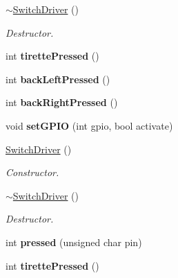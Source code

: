 \begin{DoxyCompactItemize}
\hyperlink{classSwitchDriver_a8a8cb8dff5ed4c61b9da36389c21dcf8}{$\sim$\+Switch\+Driver} ()
\begin{DoxyCompactList}\small\item\em Destructor. \end{DoxyCompactList}\item 
\mbox{\label{classSwitchDriver_a1b2f0e72af9da5be2432978f13bf52ca}} 
int {\bfseries tirette\+Pressed} ()
\item 
\mbox{\label{classSwitchDriver_a97cf6ca8501fbd0ca937c366b32ee191}} 
int {\bfseries back\+Left\+Pressed} ()
\item 
\mbox{\label{classSwitchDriver_af20343abbad7e959ce0fadb3c8bdb145}} 
int {\bfseries back\+Right\+Pressed} ()
\item 
\mbox{\label{classSwitchDriver_a1523b4e4d6f833ac1fbcb6204104d287}} 
void {\bfseries set\+G\+P\+IO} (int gpio, bool activate)
\item 
\mbox{\label{classSwitchDriver_a318f2cc1988d9ddfae71131fcf39d929}} 
\hyperlink{classSwitchDriver_a318f2cc1988d9ddfae71131fcf39d929}{Switch\+Driver} ()
\begin{DoxyCompactList}\small\item\em Constructor. \end{DoxyCompactList}\item 
\mbox{\label{classSwitchDriver_a8a8cb8dff5ed4c61b9da36389c21dcf8}} 
\hyperlink{classSwitchDriver_a8a8cb8dff5ed4c61b9da36389c21dcf8}{$\sim$\+Switch\+Driver} ()
\begin{DoxyCompactList}\small\item\em Destructor. \end{DoxyCompactList}\item 
\mbox{\label{classSwitchDriver_a379d72f1adda71986eda15ac793e47b2}} 
int {\bfseries pressed} (unsigned char pin)
\item 
\mbox{\label{classSwitchDriver_a1b2f0e72af9da5be2432978f13bf52ca}} 
int {\bfseries tirette\+Pressed} ()
\item 
\mbox{\label{classSwitchDriver_a97cf6ca8501fbd0ca937c366b32ee191}} 

\end{DoxyCompactItemize}
